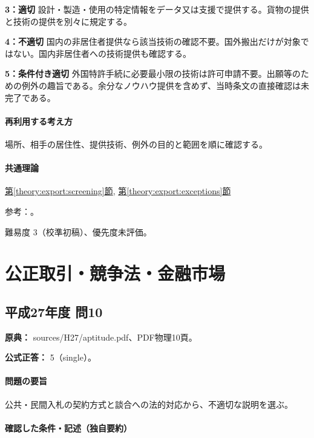 \noindent\textbf{3：適切} 設計・製造・使用の特定情報をデータ又は支援で提供する。貨物の提供と技術の提供を別々に規定する。\par

\noindent\textbf{4：不適切} 国内の非居住者提供なら該当技術の確認不要。国外搬出だけが対象ではない。国内非居住者への技術提供も確認する。\par

\noindent\textbf{5：条件付き適切} 外国特許手続に必要最小限の技術は許可申請不要。出願等のための例外の趣旨である。余分なノウハウ提供を含めず、当時条文の直接確認は未完了である。\par

\paragraph{再利用する考え方} 場所、相手の居住性、提供技術、例外の目的と範囲を順に確認する。

\paragraph{共通理論} \hyperref[theory:export:screening]{第\ref*{theory:export:screening}節}, \hyperref[theory:export:exceptions]{第\ref*{theory:export:exceptions}節}

\par 参考：\cite{export_overview,export_scope2022,export_current_updates}。

\par 難易度 3（校準初稿）、優先度未評価。

\section{公正取引・競争法・金融市場}

\subsection{平成27年度 問10}
\label{q:h27-reg-apt-10}

\noindent\textbf{原典：} sources/H27/aptitude.pdf、PDF物理10頁。

\textbf{公式正答：} 5（single）。

\paragraph{問題の要旨} 公共・民間入札の契約方式と談合への法的対応から、不適切な説明を選ぶ。

\paragraph{確認した条件・記述（独自要約）}\mbox{}\par

